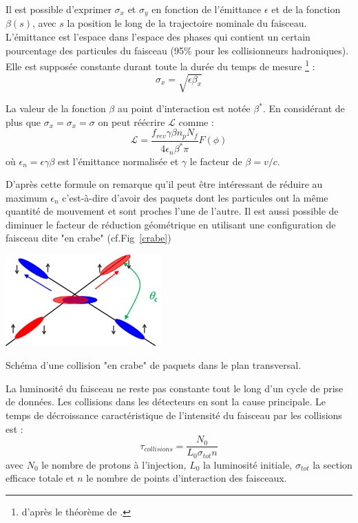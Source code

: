 Il est possible d'exprimer $\sigma_{x}$ et $\sigma_{y}$ en fonction de l'émittance $\epsilon$ et de la fonction $\beta(s)$, avec $s$ la position le long de la trajectoire nominale du faisceau. L'émittance est l'espace dans l'espace des phases qui contient un certain pourcentage des particules du faisceau (\num{95}\% pour les collisionneurs hadroniques). Elle est supposée constante durant toute la durée du temps de mesure \footnote{d'après le théorème de .} :
\begin{equation}
\sigma_{x}=\sqrt{\epsilon\beta_{x}}
\end{equation}

La valeur de la fonction $\beta$ au point d'interaction est notée $\beta^{*}$. En considérant de plus que $\sigma_{x}=\sigma_{x}=\sigma$ on peut réécrire $\mathcal{L}$ comme :
\begin{equation}
\mathcal{L}=\frac{f_{rev}\gamma\beta n_{p}N_{f}}{4\epsilon_{n}\beta^{*}\pi} F(\phi)
\end{equation}
où $\epsilon_{n}=\epsilon\gamma\beta$ est l'émittance normalisée et $\gamma$ le facteur de  $\beta=v/c$.

\newpage
D'après cette formule on remarque qu'il peut être intéressant de réduire au maximum $\epsilon_{n}$ c'est-à-dire d'avoir des paquets dont les particules ont la même quantité de mouvement et sont proches l'une de l'autre. Il est aussi possible de diminuer le facteur de réduction géométrique en utilisant une configuration de faisceau dite "en crabe" (cf.Fig~\ref{crabe})

\begin{minipagewithmarginpars}[ht!]{0.95\textwidth}
\centering
\includegraphics[width=0.45\textwidth]{LHC/crab.png}
\captionsetup{type=figure}\caption{Schéma d'une collision "en crabe" de paquets dans le plan transversal.}
\label{crabe}	
\end{minipagewithmarginpars}

La luminosité du faisceau ne reste pas constante tout le long d'un cycle de prise de données. Les collisions dans les détecteurs en sont la cause principale. Le temps de décroissance caractéristique de l'intensité du faisceau par les collisions est :
\begin{equation}
\tau_{collisions}=\frac{N_{0}}{L_{0}\sigma_{tot}n}
\end{equation}
avec $N_{0}$ le nombre de protons à l'injection, $L_{0}$ la luminosité initiale, $\sigma_{tot}$ la section efficace totale et $n$ le nombre de points d'interaction des faisceaux.

